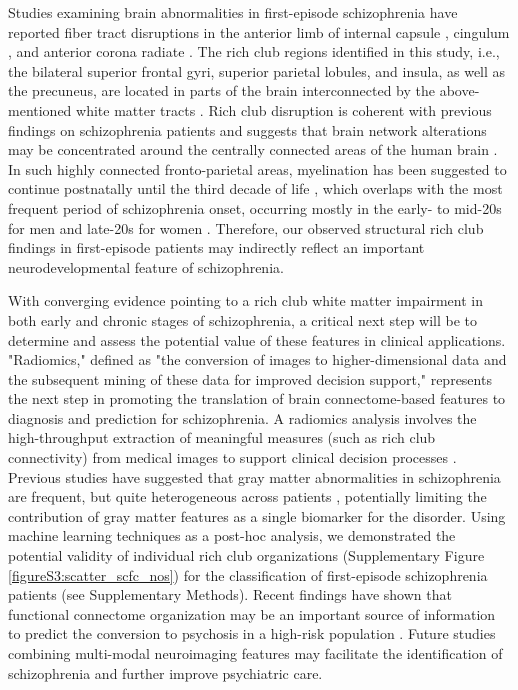 \begin{refsection}
Studies examining brain abnormalities in first-episode schizophrenia have reported fiber tract disruptions in the anterior limb of internal capsule \citep{Weiss2015ImprovedNA,Kelly2017WidespreadWM}, cingulum \citep{Xiao2018WhiteMA}, and anterior corona radiate \citep{Caprihan2015ThePR,Xi2016TheSC,Asmal2017InsightAW,Subramaniam2017WhiteMM}. The rich club regions identified in this study, i.e., the bilateral superior frontal gyri, superior parietal lobules, and insula, as well as the precuneus, are located in parts of the brain interconnected by the above-mentioned white matter tracts \citep{Greicius2008PersistentDN,vanDenHeuvel2009FunctionallyLR}. Rich club disruption is coherent with previous findings on schizophrenia patients \citep{vanDenHeuvel2013AbnormalRC,Collin2014ImpairedRC} and suggests that brain network alterations may be concentrated around the centrally connected areas of the human brain \citep{Klauser2017WhiteMD,Greicius2008PersistentDN,vanDenHeuvel2009FunctionallyLR}. In such highly connected fronto-parietal areas, myelination has been suggested to continue postnatally until the third decade of life \citep{Marn2016DevelopmentalTA,Silbereis2016TheCA}, which overlaps with the most frequent period of schizophrenia onset, occurring mostly in the early- to mid-20s for men and late-20s for women \citep{Abbas2013DIAGNOSTICAS}. Therefore, our observed structural rich club findings in first-episode patients may indirectly reflect an important neurodevelopmental feature of schizophrenia.

With converging evidence pointing to a rich club white matter impairment in both early and chronic stages of schizophrenia, a critical next step will be to determine and assess the potential value of these features in clinical applications. "Radiomics," defined as "the conversion of images to higher-dimensional data and the subsequent mining of these data for improved decision support," \citep{Gillies2016RadiomicsIA} represents the next step in promoting the translation \citep{Aerts2016ThePO} of brain connectome-based features to diagnosis and prediction for schizophrenia. A radiomics analysis involves the high-throughput extraction of meaningful measures (such as rich club connectivity) from medical images to support clinical decision processes \citep{Gillies2016RadiomicsIA}. Previous studies have suggested that gray matter abnormalities in schizophrenia are frequent, but quite heterogeneous across patients \citep{Wolfers2018MappingTH}, potentially limiting the contribution of gray matter features as a single biomarker for the disorder. Using machine learning techniques as a post-hoc analysis, we demonstrated the potential validity of individual rich club organizations (Supplementary Figure \ref{figureS3:scatter_scfc_nos}) for the classification of first-episode schizophrenia patients (see Supplementary Methods). Recent findings have shown that functional connectome organization may be an important source of information to predict the conversion to psychosis in a high-risk population \citep{Collin2018FunctionalCO}. Future studies combining multi-modal neuroimaging features may facilitate the identification of schizophrenia and further improve psychiatric care.


\end{refsection}
